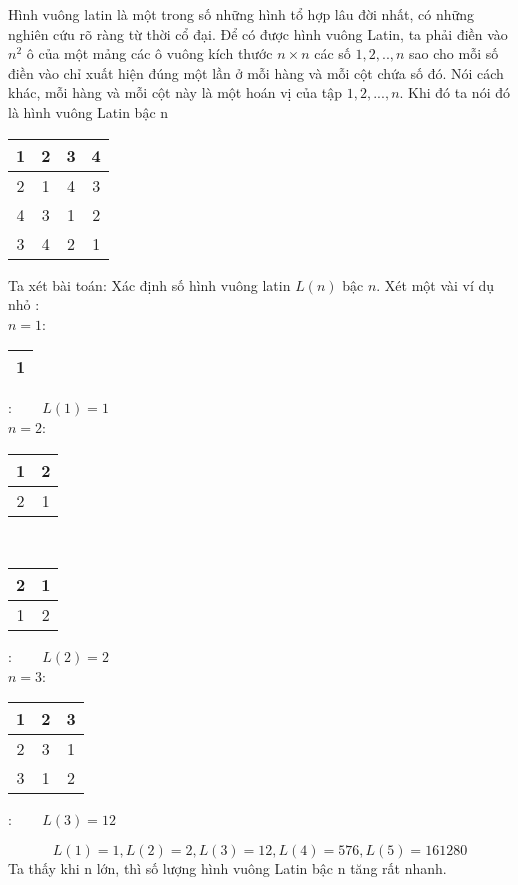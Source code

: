 \documentclass[a4paper]{report}
\begin{document}
Hình vuông latin là một trong số những hình tổ hợp lâu đời nhất, có những nghiên cứu rõ ràng từ thời cổ đại. Để có được hình vuông Latin, ta phải điền vào $n^{2}$ ô của một mảng các ô vuông kích thước $n \times n$ các số $1,2,..,n$ sao cho mỗi số điền vào chỉ xuất hiện đúng một lần ở mỗi hàng và mỗi cột chứa số đó. Nói cách khác, mỗi hàng và mỗi cột này là một hoán vị của tập ${1,2,...,n}$. Khi đó ta nói đó là hình vuông Latin bậc n

\begin{center}
    \begin{tabular}{|c|c|c|c|}
    \hline
     1&2&3&4  \\ \hline
     2&1&4&3  \\ \hline
     4&3&1&2  \\ \hline
     3&4&2&1  \\
     \hline
\end{tabular}
\end{center}
Ta xét bài toán: Xác định số hình vuông latin $L(n)$ bậc $n$. Xét một vài ví dụ nhỏ :\\
$n=1$:
\begin{tabular}{|c|}
    \hline
     1 \\ \hline
    
\end{tabular}: ~~~ $L(1) = 1$
\vspace{20pt}
\\
$n=2$:
\begin{tabular}{|c|c|}
    \hline
     1&2 \\ \hline
     2&1 \\ 
     \hline
\end{tabular} ~~~ \begin{tabular}{|c|c|}
    \hline
     2&1 \\ \hline
     1&2 \\ 
     \hline
\end{tabular}: ~~~ $L(2) = 2$
\vspace{20pt}
\\
$n=3$:
\begin{tabular}{|c|c|c|}
	\hline
	1&2&3 \\ \hline
	2&3&1 \\ \hline
	3&1&2 \\
	\hline
\end{tabular}: ~~~ $L(3) = 12$

\begin{equation*}
L(1) = 1, L(2) = 2, L(3) = 12, L(4) = 576, L(5) = 161280
\end{equation*}
Ta thấy khi n lớn, thì số lượng hình vuông Latin bậc n tăng rất nhanh. 
\end{document}
